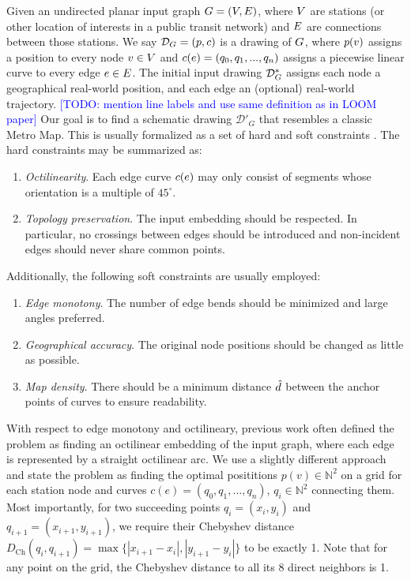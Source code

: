 \documentclass{sig-alternate-sigmod09}
\newcommand\TODO[1]{\textcolor{blue}{\small [TODO: #1]}}
\begin{document}
Given an undirected planar input graph $G = (V, E)$, where $V$ are stations (or other location of interests in a public transit network) and $E$ are connections between those stations.
We say $\mathcal{D}_{G} = (p, c)$ is a drawing of $G$, where $p(v)$ assigns a position to every node $v \in V$ and $c(e) = (q_0, q_1, ..., q_n)$ assigns a piecewise linear curve to every edge $e \in E$.
The initial input drawing $\mathcal{D}_{G}^*$ assigns each node a geographical real-world position, and each edge an (optional) real-world trajectory.
\TODO{mention line labels and use same definition as in LOOM paper}
Our goal is to find a schematic drawing $\mathcal{D}'_G$ that resembles a classic Metro Map.
This is usually formalized as a set of hard and soft constraints \cite{nb, ...}.
The hard constraints may be summarized as:
\begin{enumerate}
\setlength\itemsep{.1em}
\item \emph{Octilinearity}. Each edge curve $c(e)$ may only consist of segments whose orientation is a multiple of $45^{\circ}$.
\item \emph{Topology preservation}. The input embedding should be respected. In particular, no crossings between edges should be introduced and non-incident edges should never share common points.
\end{enumerate}
Additionally, the following soft constraints are usually employed:
\begin{enumerate}
\setlength\itemsep{.1em}
\item \emph{Edge monotony}. The number of edge bends should be minimized and large angles preferred.
\item \emph{Geographical accuracy}. The original node positions should be changed as little as possible.
\item \emph{Map density}. There should be a minimum distance $\hat d$ between the anchor points of curves to ensure readability.
\end{enumerate}

With respect to edge monotony and octilineary, previous work often defined the problem as finding an octilinear embedding of the input graph, where each edge is represented by a straight octilinear arc.
We use a slightly different approach and state the problem as finding the optimal posititions $p(v) \in \mathbb{N}^2$ on a grid for each station node and curves $c(e) = (q_0, q_1, ..., q_n)$, $q_i \in \mathbb{N}^2$ connecting them. 
Most importantly, for two succeeding points $q_i = (x_i, y_i)$ and $q_{i+1} = (x_{i+1}, y_{i+1})$, we require their Chebyshev distance $D_\text{Ch}(q_i, q_{i+1}) = \max \{|x_{i+1} - x_i|, |y_{i+1} - y_i|\}$ to be exactly 1.
Note that for any point on the grid, the Chebyshev distance to all its 8 direct neighbors is 1.
\end{document}
